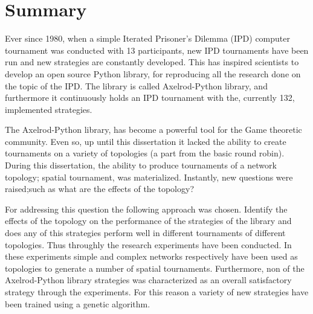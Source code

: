 \chapter{Summary}

Ever since 1980, when a simple Iterated Prisoner's Dilemma (IPD) computer
tournament was conducted with 13 participants, new IPD tournaments have been run
and new strategies are constantly developed. This has inspired scientists to develop
an open source Python library, for reproducing all the research done on the topic
of the IPD. The library is called Axelrod-Python library, and furthermore it continuously holds
an IPD tournament with the, currently 132, implemented strategies.

The Axelrod-Python library, has become a powerful tool for the Game theoretic community.
Even so, up until this dissertation it lacked the ability to create tournaments on a variety of
topologies (a part from the basic round robin).
During this dissertation, the ability to
produce tournaments of a network topology; spatial tournament, was materialized.
Instantly, new questions were raised;such as what are the effects of the topology?

For addressing this question the following approach was chosen. Identify the
effects of the topology on the performance of the strategies of the library and
does any of this strategies perform well in different tournaments of different
topologies. Thus throughly the research experiments have been conducted. In these
experiments simple and complex networks respectively have been used as topologies
to generate a number of spatial tournaments. Furthermore, non of the
Axelrod-Python library strategies was characterized as an overall satisfactory
strategy through the experiments. For this reason a variety of new strategies have
been trained using a genetic algorithm.
